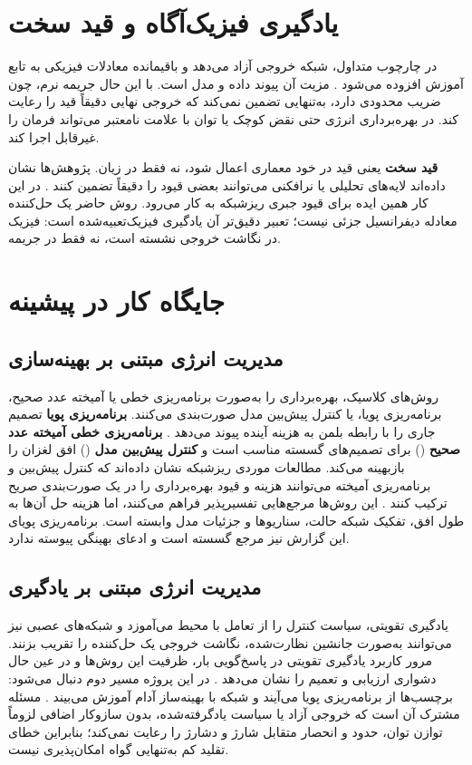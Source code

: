 \section{یادگیری فیزیک‌آگاه و قید سخت}
در چارچوب  متداول، شبکه خروجی آزاد می‌دهد و باقیمانده معادلات فیزیکی به تابع آموزش افزوده می‌شود . مزیت آن پیوند داده و مدل است. با این حال جریمه نرم، چون ضریب محدودی دارد، به‌تنهایی تضمین نمی‌کند که خروجی نهایی دقیقاً قید را رعایت کند. در بهره‌برداری انرژی حتی نقض کوچک  یا توان با علامت نامعتبر می‌تواند فرمان را غیرقابل اجرا کند.

\textbf{قید سخت} یعنی قید در خود معماری اعمال شود، نه فقط در زیان. پژوهش‌ها نشان داده‌اند لایه‌های تحلیلی یا نرافکنی می‌توانند بعضی قیود را دقیقاً تضمین کنند . در این کار همین ایده برای قیود جبری ریزشبکه به کار می‌رود. روش حاضر یک  حل‌کننده معادله دیفرانسیل جزئی نیست؛ تعبیر دقیق‌تر آن یادگیری فیزیک‌تعبیه‌شده است: فیزیک در نگاشت خروجی نشسته است، نه فقط در جریمه.

\section{جایگاه کار در پیشینه}
\subsection{مدیریت انرژی مبتنی بر بهینه‌سازی}
روش‌های کلاسیک، بهره‌برداری را به‌صورت برنامه‌ریزی خطی یا آمیخته عدد صحیح، برنامه‌ریزی پویا، یا کنترل پیش‌بین مدل صورت‌بندی می‌کنند. \textbf{برنامه‌ریزی پویا} تصمیم جاری را با رابطه بلمن به هزینه آینده پیوند می‌دهد . \textbf{برنامه‌ریزی خطی آمیخته عدد صحیح} () برای تصمیم‌های گسسته مناسب است و \textbf{کنترل پیش‌بین مدل} () افق لغزان را بازبهینه می‌کند. مطالعات موردی ریزشبکه نشان داده‌اند که کنترل پیش‌بین و برنامه‌ریزی آمیخته می‌توانند هزینه و قیود بهره‌برداری را در یک صورت‌بندی صریح ترکیب کنند . این روش‌ها مرجع‌هایی تفسیرپذیر فراهم می‌کنند، اما هزینه حل آن‌ها به طول افق، تفکیک شبکه حالت، سناریوها و جزئیات مدل وابسته است. برنامه‌ریزی پویای این گزارش نیز مرجع گسسته است و ادعای بهینگی پیوسته ندارد.

\subsection{مدیریت انرژی مبتنی بر یادگیری}
یادگیری تقویتی، سیاست کنترل را از تعامل با محیط می‌آموزد و شبکه‌های عصبی نیز می‌توانند به‌صورت جانشین نظارت‌شده، نگاشت خروجی یک حل‌کننده را تقریب بزنند. مرور کاربرد یادگیری تقویتی در پاسخ‌گویی بار، ظرفیت این روش‌ها و در عین حال دشواری ارزیابی و تعمیم را نشان می‌دهد . در این پروژه مسیر دوم دنبال می‌شود: برچسب‌ها از برنامه‌ریزی پویا می‌آیند و شبکه با بهینه‌ساز آدام آموزش می‌بیند . مسئله مشترک آن است که خروجی آزاد یا سیاست یادگرفته‌شده، بدون سازوکار اضافی لزوماً توازن توان، حدود  و انحصار متقابل شارژ و دشارژ را رعایت نمی‌کند؛ بنابراین خطای تقلید کم به‌تنهایی گواه امکان‌پذیری نیست.

